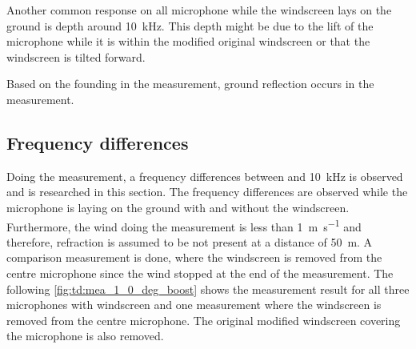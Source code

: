 Another common response on all microphone while the windscreen lays on the ground is depth around \SI{10}{\kilo\hertz}. This depth might be due to the lift of the microphone while it is within the modified original windscreen or that the windscreen is tilted forward.

Based on the founding in the measurement, ground reflection occurs in the measurement.


\subsection{Frequency differences}\label{sec:des:freq_boost}
Doing the measurement, a frequency differences between  and \SI{10}{\kilo\hertz} is observed and is researched in this section. The frequency differences are observed while the microphone is laying on the ground with and without the windscreen. Furthermore, the wind doing the measurement is less than \SI{1}{\meter\per\second} and therefore, refraction is assumed to be not present at a distance of \SI{50}{\meter}. A comparison measurement is done, where the windscreen is removed from the centre microphone since the wind stopped at the end of the measurement. The following \autoref{fig:td:mea_1_0_deg_boost} shows the measurement result for all three microphones with windscreen and one measurement where the windscreen is removed from the centre microphone. The original modified windscreen covering the microphone is also removed. 



